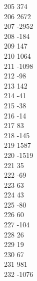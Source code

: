 { 205	374 \\
 206	2672 \\
 207	-2952 \\
 208	-184 \\
 209	147 \\
 210	1064 \\
 211	-1098 \\
 212	-98 \\
 213	142 \\
 214	-41 \\
 215	-38 \\
 216	-14 \\
 217	83 \\
 218	-145 \\
 219	1587 \\
 220	-1519 \\
 221	35 \\
 222	-69 \\
 223	63 \\
 224	43 \\
 225	-80 \\
 226	60 \\
 227	-104 \\
 228	26 \\
 229	19 \\
 230	67 \\
 231	981 \\
 232	-1076 \\
}
